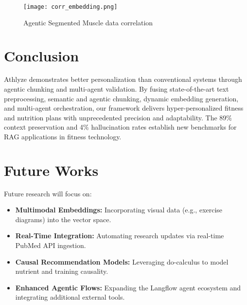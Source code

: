 \documentclass[conference]{IEEEtran}
\begin{document}
\begin{figure}[h!]
    \centering
    \texttt{[image: corr\_embedding.png]}
    \caption{Agentic Segmented Muscle data correlation}
    \label{fig:RAG}
\end{figure}

\section{Conclusion}
Athlyze demonstrates better personalization than conventional systems through agentic chunking and multi-agent validation. By fusing state-of-the-art text preprocessing, semantic and agentic chunking, dynamic embedding generation, and multi-agent orchestration, our framework delivers hyper-personalized fitness and nutrition plans with unprecedented precision and adaptability. The 89\% context preservation and 4\% hallucination rates establish new benchmarks for RAG applications in fitness technology.

\section{Future Works}
Future research will focus on:
\begin{itemize}
    \item \textbf{Multimodal Embeddings:} Incorporating visual data (e.g., exercise diagrams) into the vector space.
    \item \textbf{Real-Time Integration:} Automating research updates via real-time PubMed API ingestion. \cite{11}
    \item \textbf{Causal Recommendation Models:} Leveraging do-calculus to model nutrient and training causality. \cite{5}
    \item \textbf{Enhanced Agentic Flows:} Expanding the Langflow agent ecosystem and integrating additional external tools.\\
\end{itemize}
\end{document}
